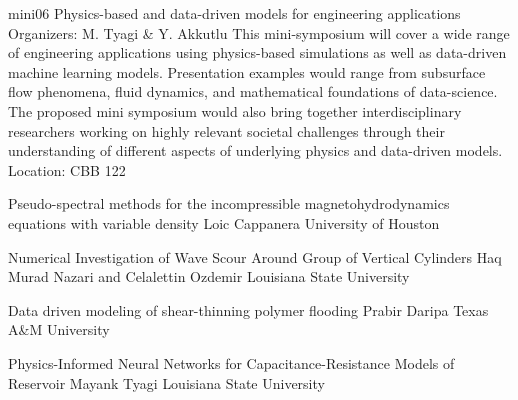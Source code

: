 \mini
{mini06}
{Physics-based and data-driven models for engineering applications}
{Organizers: M. Tyagi \& Y. Akkutlu}
{This mini-symposium will cover a wide range of engineering applications using physics-based simulations as well as data-driven machine learning models. Presentation examples would range from subsurface flow phenomena, fluid dynamics, and mathematical foundations of data-science. The proposed mini symposium would also bring together interdisciplinary researchers working on highly relevant societal challenges through their understanding of different aspects of underlying physics and data-driven models.}
{Location: CBB 122}

\begin{talks}
\item\talk
{Pseudo-spectral methods for the incompressible magnetohydrodynamics equations with variable density}
{Loic Cappanera}
{University of Houston}
\item\talk
{Numerical Investigation of Wave Scour Around Group of Vertical Cylinders }
{Haq Murad Nazari and  Celalettin Ozdemir}
{Louisiana State University}
\item\talk
{Data driven modeling of shear-thinning polymer flooding}
{Prabir Daripa}
{Texas A\&M University}
\item\talk
{Physics-Informed Neural Networks for Capacitance-Resistance Models of Reservoir}
{Mayank Tyagi}
{Louisiana State University}
\end{talks}
\room
